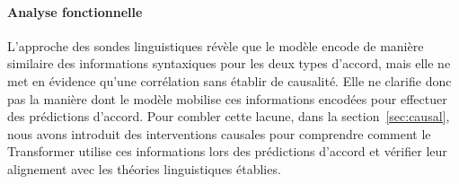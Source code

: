 \paragraph{Analyse fonctionnelle} 
L'approche des sondes linguistiques révèle que le modèle encode de manière similaire des informations syntaxiques pour les deux types d'accord, mais elle ne met en évidence qu'une corrélation sans établir de causalité. Elle ne clarifie donc pas la manière dont le modèle mobilise ces informations encodées pour effectuer des prédictions d'accord.
Pour combler cette lacune, dans la section~\ref{sec:causal}, nous avons introduit des interventions causales pour comprendre comment le Transformer utilise ces informations lors des prédictions d'accord et vérifier leur alignement avec les théories linguistiques établies.

